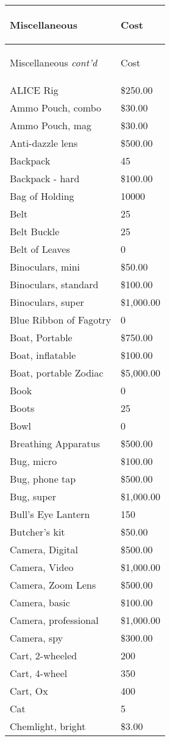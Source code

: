 \documentclass[twoside]{book}
\begin{document}
\begin{longtable}{p{1.25in}l} 
  Miscellaneous& \begin{turn}{70}{Cost}\end{turn}
          \\
  \hline
  \hline
  \endfirsthead
  Miscellaneous \textit{cont'd}
        & \begin{turn}{70}{Cost}\end{turn}
           \\
  \hline
  \endhead
\raggedright  ALICE Rig& \$250.00\tabularnewline
      \raggedright  Ammo Pouch, combo& \$30.00\tabularnewline
      \raggedright  Ammo Pouch, mag& \$30.00\tabularnewline
      \raggedright  Anti-dazzle lens& \$500.00\tabularnewline
      \raggedright  Backpack& 45\tabularnewline
      \raggedright  Backpack - hard& \$100.00\tabularnewline
      \raggedright  Bag of Holding& 10000\tabularnewline
      \raggedright  Belt& 25\tabularnewline
      \raggedright  Belt Buckle& 25\tabularnewline
      \raggedright  Belt of Leaves& 0\tabularnewline
      \raggedright  Binoculars, mini& \$50.00\tabularnewline
      \raggedright  Binoculars, standard& \$100.00\tabularnewline
      \raggedright  Binoculars, super& \$1,000.00\tabularnewline
      \raggedright  Blue Ribbon of Fagotry& 0\tabularnewline
      \raggedright  Boat, Portable& \$750.00\tabularnewline
      \raggedright  Boat, inflatable& \$100.00\tabularnewline
      \raggedright  Boat, portable Zodiac& \$5,000.00\tabularnewline
      \raggedright  Book& 0\tabularnewline
      \raggedright  Boots& 25\tabularnewline
      \raggedright  Bowl& 0\tabularnewline
      \raggedright  Breathing Apparatus& \$500.00\tabularnewline
      \raggedright  Bug, micro& \$100.00\tabularnewline
      \raggedright  Bug, phone tap& \$500.00\tabularnewline
      \raggedright  Bug, super& \$1,000.00\tabularnewline
      \raggedright  Bull's Eye Lantern& 150\tabularnewline
      \raggedright  Butcher's kit& \$50.00\tabularnewline
      \raggedright  Camera, Digital& \$500.00\tabularnewline
      \raggedright  Camera, Video& \$1,000.00\tabularnewline
      \raggedright  Camera, Zoom Lens& \$500.00\tabularnewline
      \raggedright  Camera, basic& \$100.00\tabularnewline
      \raggedright  Camera, professional& \$1,000.00\tabularnewline
      \raggedright  Camera, spy& \$300.00\tabularnewline
      \raggedright  Cart, 2-wheeled& 200\tabularnewline
      \raggedright  Cart, 4-wheel& 350\tabularnewline
      \raggedright  Cart, Ox& 400\tabularnewline
      \raggedright  Cat& 5\tabularnewline
      \raggedright  Chemlight, bright& \$3.00\tabularnewline

\end{longtable}
\end{document}
